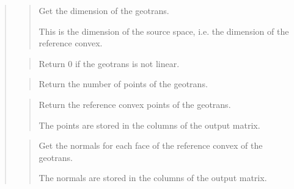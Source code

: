 \documentclass[a4paper,11pt,english]{sphinxmanual}
\begin{document}
\sphinxAtStartPar
{}
\begin{quote}

\sphinxAtStartPar
{}
\begin{quote}

\sphinxAtStartPar
Get the dimension of the geotrans.

\sphinxAtStartPar
This is the dimension of the source space, i.e. the dimension of
the reference convex.
\end{quote}

\sphinxAtStartPar
{}
\begin{quote}

\sphinxAtStartPar
Return 0 if the geotrans is not linear.
\end{quote}

\sphinxAtStartPar
{}
\begin{quote}

\sphinxAtStartPar
Return the number of points of the geotrans.
\end{quote}

\sphinxAtStartPar
{}
\begin{quote}

\sphinxAtStartPar
Return the reference convex points of the geotrans.

\sphinxAtStartPar
The points are stored in the columns of the output matrix.
\end{quote}

\sphinxAtStartPar
{}
\begin{quote}

\sphinxAtStartPar
Get the normals for each face of the reference convex of the geotrans.

\sphinxAtStartPar
The normals are stored in the columns of the output matrix.
\end{quote}

\sphinxAtStartPar
{}
\begin{quote}


\end{quote}
\end{quote}
\end{document}
